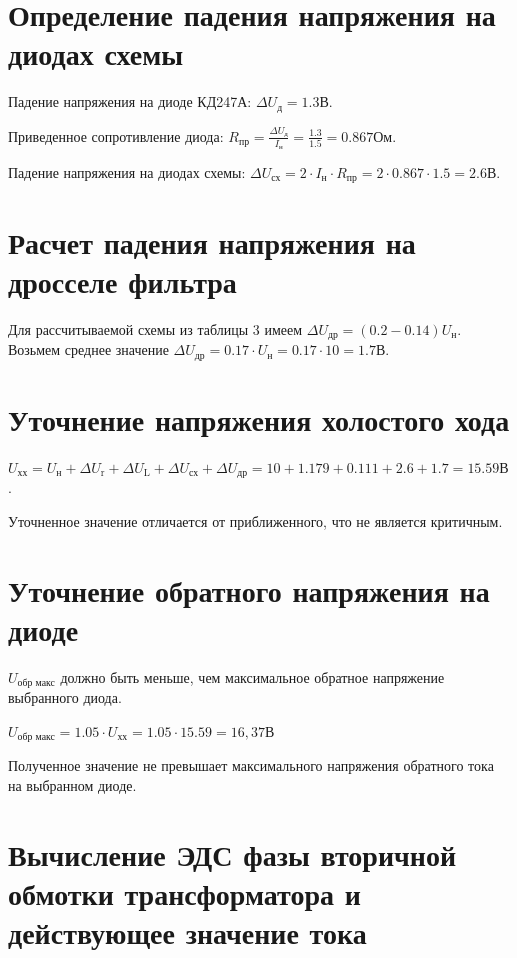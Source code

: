 \documentclass[a4paper, 14pt]{article}
\begin{document}
\section{Определение падения напряжения на диодах схемы}
Падение напряжения на диоде КД247А: $\Delta U_\text{д} = 1.3 \text{В}$.

Приведенное сопротивление диода: $R_\text{пр} = \frac{\Delta U_\text{д}}{I_\text{н}} = \frac{1.3}{1.5} = 0.867 \text{Ом} $.

Падение напряжения на диодах схемы: $\Delta U_\text{сх} = 2 \cdot I_\text{н} \cdot R_\text{пр} = 2 \cdot 0.867 \cdot 1.5 = 2.6 \text{В}$.

\section{Расчет падения напряжения на дросселе фильтра}

Для рассчитываемой схемы из таблицы 3 имеем $\Delta U_\text{др} = (0.2 - 0.14)U_\text{н} $. Возьмем среднее значение $\Delta U_\text{др} = 0.17 \cdot U_\text{н} = 0.17 \cdot 10 = 1.7 \text{В}$.

\section{Уточнение напряжения холостого хода}
$U_\text{хх} = U_\text{н} + \Delta U_\text{r} + \Delta U_\text{L} + \Delta U_\text{сх} + \Delta U_\text{др} = 10 + 1.179 + 0.111 + 2.6 + 1.7 = 15.59 \text{В} $.

Уточненное значение отличается от приближенного, что не является критичным.

\section{Уточнение обратного напряжения на диоде}

$U_\text{обр макс}$ должно быть меньше, чем максимальное обратное напряжение выбранного диода.

$U_\text{обр макс} = 1.05 \cdot U_\text{хх} = 1.05 \cdot 15.59 = 16,37 \text{В}$

Полученное значение не превышает максимального напряжения обратного тока на выбранном диоде.

\section{Вычисление ЭДС фазы вторичной обмотки трансформатора и действующее значение тока}
\end{document}
